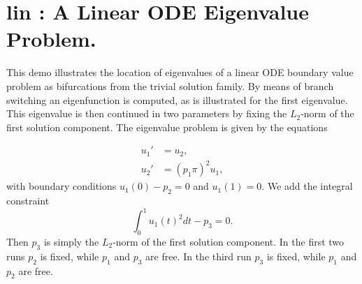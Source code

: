 \documentclass[12pt]{report}
\begin{document}
\newpage
\section{ lin : A Linear ODE Eigenvalue Problem.} \label{sec:Demos_lin}
This demo illustrates the location of eigenvalues of a linear ODE
boundary value problem as bifurcations from the trivial solution family.
By means of branch switching an eigenfunction is computed,
as is illustrated for the first eigenvalue. 
This eigenvalue is then continued in two parameters
by fixing the $L_2$-norm of the first solution component.
The eigenvalue problem is given by the equations

\begin{equation} \begin{array}{cl}
  u_1 ' &= u_2  ,  \\
  u_2 ' &= (p_1 \pi)^{2} u_1 , \end{array} \end{equation}
with boundary conditions $ u_1(0)-p_2=0 $ and $  u_1(1)=0.$
We add the integral constraint
 $$ \int_0^{1} u_1(t)^{2} dt - p_3 = 0. $$
Then $p_3$ is simply the $L_2$-norm of the first solution component.
In the first two runs $p_2$ is fixed, while $p_1$ and $p_3$ are free.
In the third run  $p_3$ is fixed, while $p_1$ and $p_2$ are free.
\end{document}
